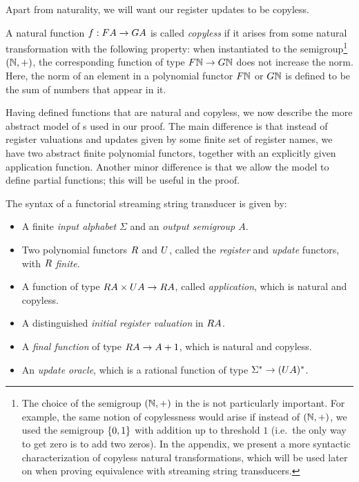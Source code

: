 Apart from naturality, we will want our register updates to be copyless. 

\begin{definition} \label{def:copyless} A natural function $f : \functor A \to \functorg A$ is  called \emph{copyless} if it arises from some natural transformation with the following property:  when instantiated to the semigroup\footnote{The choice of the semigroup $({\mathbb N},+)$ in the  is not particularly important. For example, the same notion of copylessness would arise if instead of $({\mathbb N},+)$, we used the semigroup $\{0,1\}$ with addition up to threshold $1$ (i.e.~the only way to get zero is to add two zeros). In the appendix, we present a more syntactic characterization of copyless natural transformations, which will be used later on when proving equivalence with streaming string transducers. 
    } $({\mathbb N},+)$, the corresponding function of type $\functor \Nat \to \functorg \Nat$ 
    does not increase the norm. Here, the norm of an element in a polynomial functor $\functor \Nat$ or $\functorg \Nat$ is defined to be the sum of numbers that appear in it.
\end{definition}





Having defined functions that are natural and copyless, we now describe the more abstract model of \sst{}s used in our proof. The main difference is that instead of register valuations and updates given by some finite set of register names, we have two abstract finite polynomial functors, together with an explicitly given application function. Another minor difference is that we allow the model to define partial functions; this will be useful in the proof.


\begin{definition}\label{def:functorial-sst}
    The syntax of a functorial streaming string transducer is given by:
    \begin{itemize}
        \item A finite \emph{input alphabet} $\Sigma$ and an \emph{output semigroup $A$}.
    \item Two polynomial functors $\functorr$ and $\functoru$, called the \emph{register} and \emph{update} functors, with $\functorr$ \emph{finite}.
    \item A function of type $\functorr A \times \functoru A \to \functorr A$, called \emph{application}, which is natural and copyless.
    \item A distinguished \emph{initial register valuation}  in $\functorr A$.
    \item A \emph{final function} of type $\functorr A \to A + 1$, which is natural and copyless.
    \item An \emph{update oracle}, which is a rational function of type $\Sigma^* \to (\functoru A)^*$.
    \end{itemize}
\end{definition}

